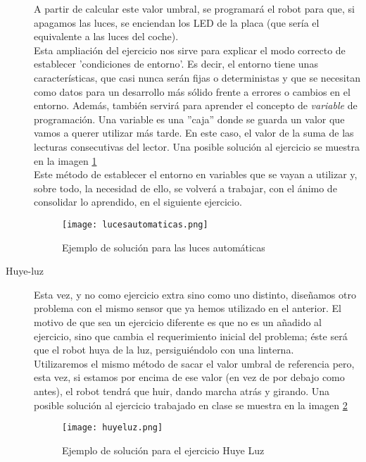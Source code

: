 \begin{description}
A partir de calcular este valor umbral, se programará el robot para que, si apagamos las luces, se enciendan los LED de la placa (que sería el equivalente a las luces del coche).\\
Esta ampliación del ejercicio nos sirve para explicar el modo correcto de establecer 'condiciones de entorno'. Es decir, el entorno tiene unas características, que casi nunca serán fijas o deterministas y que se necesitan como datos para un desarrollo más sólido frente a errores o cambios en el entorno. Además, también servirá para aprender el concepto de \textit{variable} de programación. Una variable es una ''caja'' donde se guarda un valor que vamos a querer utilizar más tarde. En este caso, el valor de la suma de las lecturas consecutivas del lector. Una posible solución al ejercicio se muestra en la imagen \ref{img:lucesautomaticas} \\
Este método de establecer el entorno en variables que se vayan a utilizar y, sobre todo, la necesidad de ello, se volverá a trabajar, con el ánimo de consolidar lo aprendido, en el siguiente ejercicio. 
\begin{figure}[h]
	\centering
	\texttt{[image: lucesautomaticas.png]}	
	\caption{Ejemplo de solución para las luces automáticas}
	\label{img:lucesautomaticas}
\end{figure}

\item[Huye-luz]\label{ej:huyeLuz}
Esta vez, y no como ejercicio extra sino como uno distinto, diseñamos otro problema con el mismo sensor que ya hemos utilizado en el anterior. El motivo de que sea un ejercicio diferente es que no es un añadido al ejercicio, sino que cambia el requerimiento inicial del problema; éste será que el robot huya de la luz, persiguiéndolo con una linterna.\\
Utilizaremos el mismo método de sacar el valor umbral de referencia pero, esta vez, si estamos por encima de ese valor (en vez de por debajo como antes), el robot tendrá que huir, dando marcha atrás y girando. Una posible solución al ejercicio trabajado en clase se muestra en la imagen \ref{img:huyeluz}\\

\begin{figure}[h]
	\centering
	\texttt{[image: huyeluz.png]}	
	\caption{Ejemplo de solución para el ejercicio Huye Luz}
	\label{img:huyeluz}
\end{figure}


\end{description}
